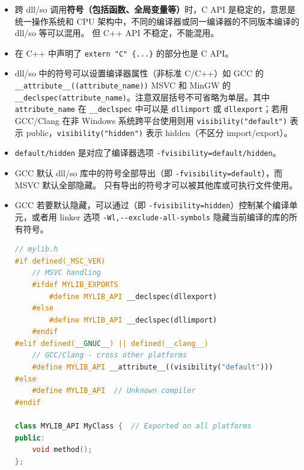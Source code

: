 

\begin{itemize}
\item 跨 dll/so 调用\textbf{符号（包括函数、全局变量等）}时，C API 是稳定的，意思是统一操作系统和 CPU 架构中，不同的编译器或同一编译器的不同版本编译的 dll/so 等可以混用。 但 C++ API 不稳定，不能混用。
\item 在 C++ 中声明了 \verb`extern "C" {...}` 的部分也是 C API。
\item dll/so 中的符号可以设置编译器属性（非标准 C/C++）如 GCC 的 \verb`__attribute__((attribute_name))` MSVC 和 MinGW 的 \verb`__declspec(attribute_name)`。注意双层括号不可省略为单层。其中 \verb`attribute_name` 在 \verb`__declspec` 中可以是 \verb`dllimport` 或 \verb`dllexport`；若用 GCC/Clang 在非 Windows 系统跨平台使用则用 \verb`visibility("default")` 表示 public，\verb`visibility("hidden")` 表示 hidden（不区分 import/export）。
\item \verb`default/hidden` 是对应了编译器选项 \verb`-fvisibility=default/hidden`。
\item GCC 默认 dll/so 库中的符号全部导出（即 \verb`-fvisibility=default`），而 MSVC 默认全部隐藏。 只有导出的符号才可以被其他库或可执行文件使用。
\item GCC 若要默认隐藏，可以通过（即 \verb`-fvisibility=hidden`）控制某个编译单元，或者用 linker 选项 \verb`-Wl,--exclude-all-symbols` 隐藏当前编译的库的所有符号。
\begin{lstlisting}[language=cpp]
// mylib.h
#if defined(_MSC_VER)
    // MSVC handling
    #ifdef MYLIB_EXPORTS
        #define MYLIB_API __declspec(dllexport)
    #else
        #define MYLIB_API __declspec(dllimport)
    #endif
#elif defined(__GNUC__) || defined(__clang__)
    // GCC/Clang - cross other platforms
    #define MYLIB_API __attribute__((visibility("default")))
#else
    #define MYLIB_API  // Unknown compiler
#endif

class MYLIB_API MyClass {  // Exported on all platforms
public:
    void method();
};
\end{lstlisting}
\end{itemize}
